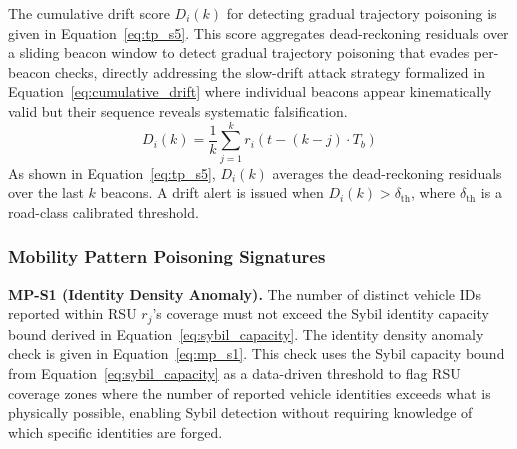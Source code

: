 \documentclass[12pt, a4paper]{report}
\begin{document}
The cumulative drift score $D_i(k)$ for detecting
gradual trajectory poisoning is given in
Equation~\ref{eq:tp_s5}.
\newline
\newline
This score aggregates dead-reckoning residuals over a sliding beacon
window to detect gradual trajectory poisoning that evades per-beacon
checks, directly addressing the slow-drift attack strategy formalized
in Equation~\ref{eq:cumulative_drift} where individual beacons appear
kinematically valid but their sequence reveals systematic falsification.
\begin{equation}
  D_i(k) = \frac{1}{k}\sum_{j=1}^{k} r_i(t - (k-j)\cdot T_b)
  \label{eq:tp_s5}
\end{equation}
As shown in Equation~\ref{eq:tp_s5}, $D_i(k)$ averages the
dead-reckoning residuals over the last $k$ beacons. A drift alert
is issued when $D_i(k) > \delta_{\mathrm{th}}$, where
$\delta_{\mathrm{th}}$ is a road-class calibrated threshold.

\newpage
\subsubsection{Mobility Pattern Poisoning Signatures}

\textbf{MP-S1 (Identity Density Anomaly).}
The number of distinct vehicle IDs reported within RSU $r_j$'s coverage
must not exceed the Sybil identity capacity bound derived in
Equation~\ref{eq:sybil_capacity}. The identity density anomaly check
is given in Equation~\ref{eq:mp_s1}.
\newline
\newline
This check uses the Sybil capacity bound from
Equation~\ref{eq:sybil_capacity} as a data-driven threshold to flag
RSU coverage zones where the number of reported vehicle identities
exceeds what is physically possible, enabling Sybil detection without
requiring knowledge of which specific identities are forged.
\end{document}
